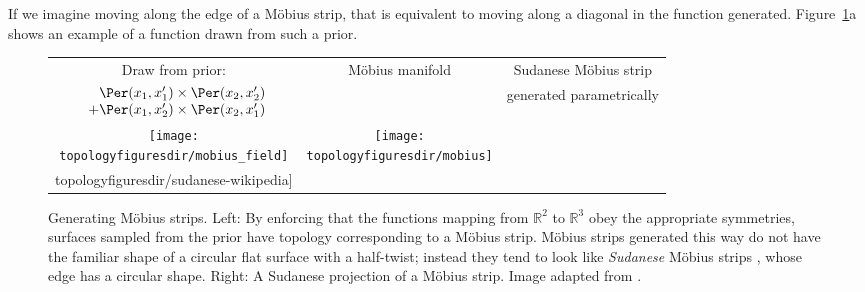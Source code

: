 If we imagine moving along the edge of a M\"{o}bius strip, that is equivalent to moving along a diagonal in the function generated.
Figure~\ref{fig:mobius}a shows an example of a function drawn from such a prior.
%
\begin{figure}
\begin{tabular}[t]{c|c|c}
\centering
Draw from \gp{} prior: &  M\"{o}bius manifold & Sudanese M\"{o}bius strip \\
$\begin{array}{r@{}l@{}}
&\Per(x_1, x_1') \times \Per(x_2, x_2') \\
          + & \Per(x_1, x_2') \times \Per(x_2, x_1')
\end{array}$
& & generated parametrically\\
\texttt{[image: \\topologyfiguresdir/mobius\_field]} & 
\texttt{[image: \\topologyfiguresdir/mobius]} &
\raisebox{1cm}{\texttt{[image: \\topologyfiguresdir/sudanese-wikipedia]}}
\end{tabular}
\caption[Generating M\"{o}bius strips]{Generating M\"{o}bius strips.
Left: By enforcing that the functions mapping from $\mathbb{R}^2$ to $\mathbb{R}^3$ obey the appropriate symmetries, surfaces sampled from the prior have topology corresponding to a M\"{o}bius strip.
M\"{o}bius strips generated this way do not have the familiar shape of a circular flat surface with a half-twist; instead they tend to look like \emph{Sudanese} M\"{o}bius strips \citep{sudanese1984}, whose edge has a circular shape.
Right: A Sudanese projection of a M\"{o}bius strip.
Image adapted from \citep{sudanesepict}.
}
\label{fig:mobius}
\end{figure}
